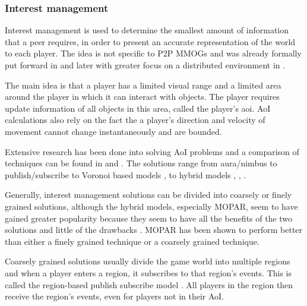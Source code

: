 \documentclass[10pt,a4paper,journal,cspaper,compsoc]{IEEEtran}
\begin{document}


\subsubsection{Interest management}
\label{key_challenges_im}

Interest management is used to determine the smallest amount of information that a peer requires, in order to present an accurate representation of
the world to each player. The idea is not specific to P2P MMOGs and was already formally put forward in \cite{First_IM} and later with greater focus
on a distributed environment in \cite{Whang_agent_based_IM}.

The main idea is that a player has a limited visual range and a limited area around the player in which it can interact with objects. The player
requires update information of all objects in this area, called the player's \ac{aoi}. AoI calculations also rely on the fact the a player's
direction and velocity of movement cannot change instantaneously and are bounded.

Extensive research has been done into solving AoI problems and a comparison of techniques can be found in \cite{Boulanger_IM_compare} and
\cite{IM_and_ED_survey_Krause}. The solutions range from aura/nimbus \cite{Benford_spatial_IM} to publish/subscribe \cite{mercury_publish_subscribe}
to Voronoi based models \cite{Hu_voronoi_IM}, \cite{Buyukkaya_voronoi_state_management} to hybrid models \cite{hybrid_IM}, \cite{MOPAR},
\cite{fan_mediator_paper}.

Generally, interest management solutions can be divided into coarsely or finely grained solutions, although the hybrid models, especially MOPAR, seem
to have gained greater popularity because they seem to have all the benefits of the two solutions and little of the drawbacks \cite{MOPAR}. MOPAR has
been shown to perform better than either a finely grained technique or a coarsely grained technique.

Coarsely grained solutions usually divide the game world into multiple regions and when a player enters a region, it subscribes to that region's
events. This is called the region-based publish subscribe model \cite{Fan_deisgn_issues_p2p}. All players in the region then receive the region's
events, even for players not in their AoI.
\end{document}
